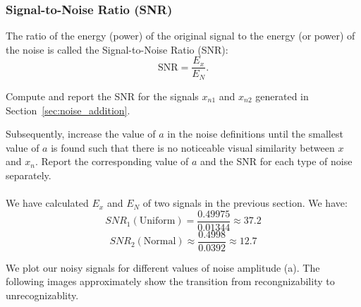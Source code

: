 \documentclass[hidelinks,12pt]{article}
\begin{document}
	\pagebreak
	
	\subsubsection{Signal-to-Noise Ratio (SNR)}
	The ratio of the energy (power) of the original signal to the energy (or power) of the noise is called the Signal-to-Noise Ratio (SNR):
	\[ \text{SNR} = \frac{E_x}{E_N}. \]
	
	 Compute and report the SNR for the signals $x_{n1}$ and $x_{n2}$ generated in Section~\ref{sec:noise_addition}.
	
	 Subsequently, increase the value of $a$ in the noise definitions until the smallest value of $a$ is found such that there is no noticeable visual similarity between $x$ and $x_n$. Report the corresponding value of $a$ and the SNR for each type of noise separately.
	\\ \\
	We have calculated $E_x$ and $E_N$ of two signals in the previous section. We have:
	$$
	SNR_1 (\text{Uniform}) = \frac{0.49975}{0.01344} \approx 37.2
	$$
	$$
	SNR_2 (\text{Normal}) \approx \frac{0.4998}{0.0392} \approx 12.7
	$$
	
	 We plot our noisy signals for different values of noise amplitude (a). The following images approximately show the transition from recongnizability to unrecognizablity.
	
\end{document}
